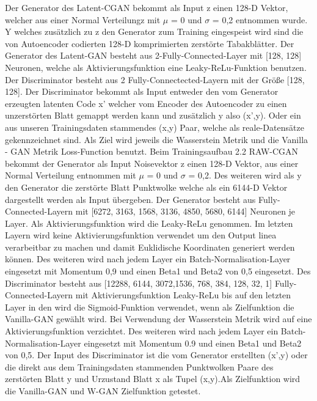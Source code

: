 \documentclass{llncs}
\begin{document}
Der Generator des Latent-CGAN bekommt als Input z einen 128-D Vektor, welcher aus einer Normal Verteilungz mit $\mu$ = 0 und $\sigma$ =  0,2 entnommen wurde. Y welches zusätzlich zu z den Generator zum Training eingespeist wird sind die von Autoencoder codierten 128-D komprimierten zerstörte Tabakblätter. Der Generator des Latent-GAN besteht aus 2-Fully-Connected-Layer mit [128, 128] Neuronen, welche als Aktivierungsfunktion eine Leaky-ReLu-Funktion benutzen. Der Discriminator besteht aus 2 Fully-Connectected-Layern mit der Größe [128, 128]. Der Discriminator bekommt als Input entweder den vom Generator erzeugten latenten Code x' welcher vom Encoder des Autoencoder zu einen unzerstörten Blatt gemappt werden kann und zusätzlich y also (x',y). Oder ein aus unseren Trainingsdaten stammendes (x,y) Paar, welche als reale-Datensätze gekennzeichnet sind. Als Ziel wird jeweils die Wasserstein Metrik und die Vanilla - GAN Metrik Loss-Function benutzt. Beim Trainingsaufbau 2.2 RAW-CGAN bekommt der Generator als Input Noisevektor z einen 128-D Vektor, aus einer  Normal Verteilung entnommen mit $\mu$ =  0 und $\sigma$ =  0,2. Des weiteren wird als y den Generator die zerstörte Blatt Punktwolke welche als ein 6144-D Vektor dargestellt werden als Input übergeben. Der Generator besteht aus Fully-Connected-Layern mit [6272, 3163, 1568, 3136, 4850, 5680, 6144] Neuronen je Layer. Als Aktivierungsfunktion wird die Leaky-ReLu genommen. Im letzten Layern wird keine Aktivierungsfunktion verwendet um den Output linea verarbeitbar zu machen und damit Euklidische Koordinaten generiert werden können. Des weiteren wird nach jedem Layer ein Batch-Normalisation-Layer eingesetzt mit Momentum 0,9 und einen Beta1 und Beta2 von 0,5 eingesetzt. Des Discriminator besteht aus [12288, 6144, 3072,1536, 768, 384, 128, 32, 1] Fully-Connected-Layern mit Aktivierungsfunktion Leaky-ReLu bis auf den letzten Layer in den wird die Sigmoid-Funktion verwendet, wenn als Zielfunktion die Vanilla-GAN gewählt wird. Bei Verwendung der Wasserstein Metrik wird auf eine Aktivierungsfunktion verzichtet. Des weiteren wird nach jedem Layer ein Batch-Normalisation-Layer eingesetzt mit Momentum 0.9 und einen Beta1 und Beta2 von 0,5. Der Input des Discriminator ist die vom Generator erstellten (x',y) oder die direkt aus dem Trainingsdaten stammenden Punktwolken Paare des zerstörten Blatt y und Urzustand Blatt x als Tupel (x,y).Als Zielfunktion wird die Vanilla-GAN und W-GAN Zielfunktion getestet.
\\\\
\end{document}
